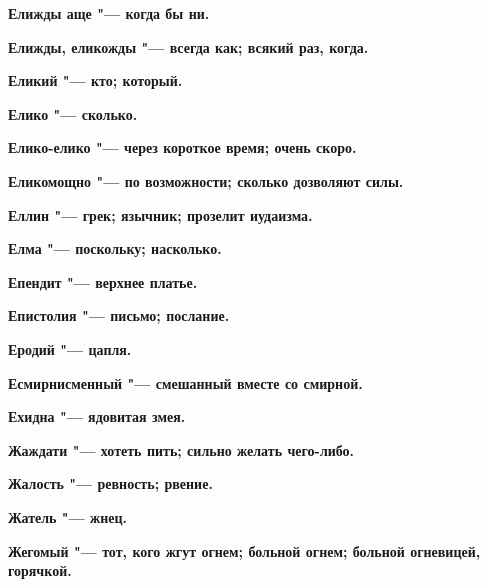 \bfseries Елижды аще \normalfont{} "--- когда бы ни. 




\bfseries Елижды, еликожды \normalfont{} "--- всегда как; всякий раз, когда. 




\bfseries Еликий \normalfont{} "--- кто; который. 




\bfseries Елико \normalfont{} "--- сколько. 




\bfseries Елико-елико \normalfont{} "--- через короткое время; очень скоро. 




\bfseries Еликомощно \normalfont{} "--- по возможности; сколько дозволяют силы. 




\bfseries Еллин \normalfont{} "--- грек; язычник; прозелит иудаизма. 




\bfseries Елма \normalfont{} "--- поскольку; насколько. 




\bfseries Епендит \normalfont{} "--- верхнее платье. 




\bfseries Епистолия \normalfont{} "--- письмо; послание. 




\bfseries Еродий \normalfont{} "--- цапля. 




\bfseries Есмирнисменный \normalfont{} "--- смешанный вместе со смирной. 




\bfseries Ехидна \normalfont{} "--- ядовитая змея. 




 





\bfseries Жаждати \normalfont{} "--- хотеть пить; сильно желать чего-либо. 




\bfseries Жалость \normalfont{} "--- ревность; рвение. 




\bfseries Жатель \normalfont{} "--- жнец. 




\bfseries Жегомый \normalfont{} "--- тот, кого жгут огнем; больной огнем; больной огневицей, горячкой. 




